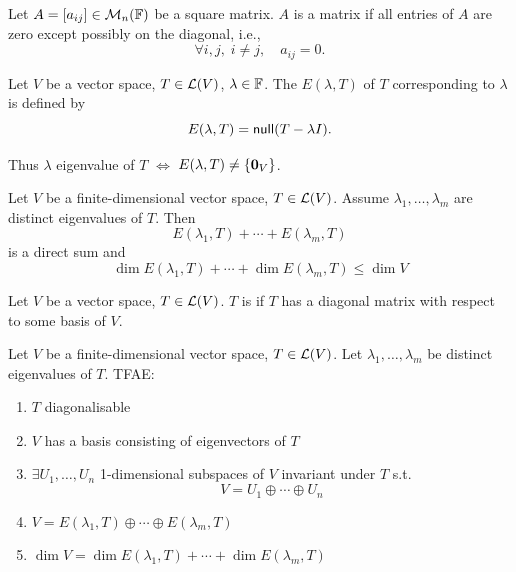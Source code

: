 \documentclass[aspectratio=169]{beamer}
\begin{document}
\begin{frame}
\begin{definition}
Let $A=[a_{ij}]\in\mathcal{M}_n(\mathbb{F})$ be a square matrix. $A$ is a  matrix if all entries of $A$ are zero except possibly on the diagonal, i.e.,
\[
\forall i,j,\;i\neq j,\quad a_{ij}=0.
\]
\end{definition}

\begin{definition}[Eigenspace]
Let $V$ be a vector space, $T\in\mathcal{L}(V)$, $\lambda\in\mathbb{F}$. The  $E(\lambda,T)$ of $T$ corresponding to $\lambda$ is defined by
\[
E(\lambda,T)=\mathsf{null}(T-\lambda I).
\]
\end{definition}

Thus $\lambda$ eigenvalue of $T$ $\Leftrightarrow$ $E(\lambda,T)\neq\{\b0_V\}$.
\end{frame}


\begin{frame}
\begin{theorem}
Let $V$ be a finite-dimensional vector space, $T\in\mathcal{L}(V)$. Assume $\lambda_1,\ldots,\lambda_m$ are distinct eigenvalues of $T$. Then
\[
E(\lambda_1,T)+\cdots+E(\lambda_m,T)
\]
is a direct sum and
\[
\dim E(\lambda_1,T)+\cdots+\dim E(\lambda_m,T)\leq \dim V
\]
\end{theorem}
\end{frame}


\begin{frame}
\begin{definition}
Let $V$ be a vector space, $T\in\mathcal{L}(V)$. $T$ is  if $T$ has a diagonal matrix with respect to some basis of $V$.
\end{definition}
\begin{importanttheorem}
Let $V$ be a finite-dimensional vector space, $T\in\mathcal{L}(V)$. Let $\lambda_1,\ldots,\lambda_m$ be distinct eigenvalues of $T$. TFAE:
\begin{enumerate}
\item $T$ diagonalisable
\item $V$ has a basis consisting of eigenvectors of $T$
\item $\exists U_1,\ldots,U_n$ 1-dimensional subspaces of $V$ invariant under $T$ s.t.
\[
V=U_1\oplus\cdots\oplus U_n
\]
\item $V=E(\lambda_1,T)\oplus\cdots\oplus E(\lambda_m,T)$
\item $\dim V=\dim E(\lambda_1,T)+\cdots+\dim E(\lambda_m,T)$
\end{enumerate}
\end{importanttheorem}
\end{frame}
\end{document}
